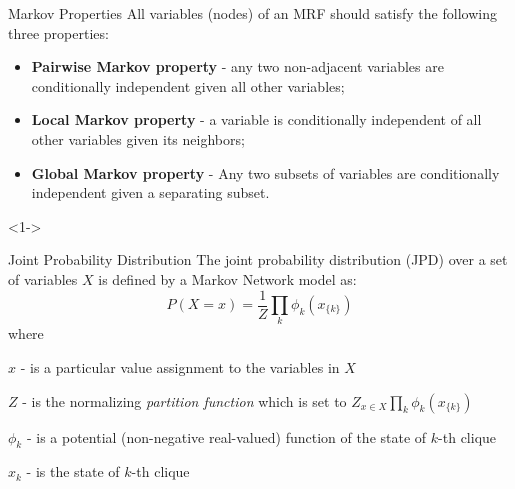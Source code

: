 \documentclass{beamer}
\begin{document}
\begin{frame}{Markov Properties}
  \scriptsize All variables (nodes) of an MRF should satisfy the following
  three properties:
  \begin{itemize}
    \item<2-> \textbf{Pairwise Markov property} - any two non-adjacent
      variables are conditionally independent given all other
      variables;
    \item<3-> \textbf{Local Markov property} - a variable is conditionally
      independent of all other variables given its neighbors;
    \item<4-> \textbf{Global Markov property} - Any two subsets of
      variables are conditionally independent given a separating
      subset.
  \end{itemize}
  \begin{example}<1->
    \begin{center}
    \end{center}
  \end{example}
  \pause
\end{frame}

\begin{frame}{Joint Probability Distribution}
  The joint probability distribution (JPD) over a set of variables $X$
  is defined by a Markov Network model as:
  \begin{equation}
    P(X=x) = \frac{1}{Z}\prod_k\phi_k(x_{\{k\}})
  \end{equation}
  where

  $x$ - is a particular value assignment to the variables in $X$

  $Z$ - is the normalizing \textit{partition function} which is set to
  $Z_{x \in X}\prod_k\phi_k(x_{\{k\}})$

  $\phi_k$ - is a potential (non-negative real-valued) function of the
  state of $k$-th clique

  $x_k$ - is the state of $k$-th clique
\end{frame}
\end{document}
